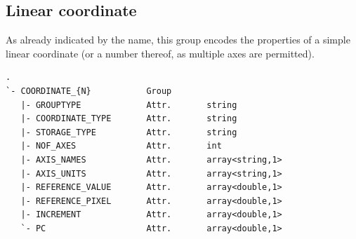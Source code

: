 \documentclass[a4paper,10pt,bibtotoc]{scrreprt}
\begin{document}

\subsection{Linear coordinate}
\label{sec:coord-linear}

As already indicated by the name, this group encodes the properties of a simple
linear coordinate (or a number thereof, as multiple axes are permitted).



\begin{lstlisting}[float,caption={Structure of the linear coordinate group.}]
.
`- COORDINATE_{N}           Group
   |- GROUPTYPE             Attr.       string
   |- COORDINATE_TYPE       Attr.       string
   |- STORAGE_TYPE          Attr.       string
   |- NOF_AXES              Attr.       int
   |- AXIS_NAMES            Attr.       array<string,1>
   |- AXIS_UNITS            Attr.       array<string,1>
   |- REFERENCE_VALUE       Attr.       array<double,1>
   |- REFERENCE_PIXEL       Attr.       array<double,1>
   |- INCREMENT             Attr.       array<double,1>
   `- PC                    Attr.       array<double,1>
\end{lstlisting}
\end{document}
